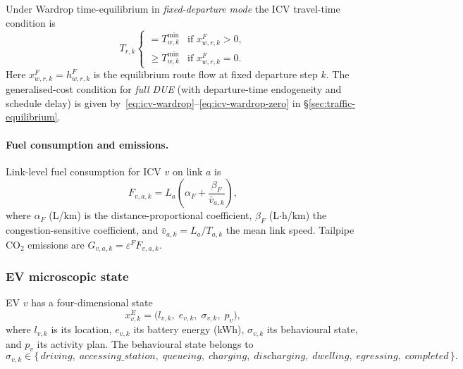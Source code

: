 Under Wardrop time-equilibrium in \emph{fixed-departure mode} the ICV
travel-time condition is
\begin{equation}
  T_{r,k} \begin{cases}
    = T^{\min}_{w,k}   & \text{if } x^F_{w,r,k} > 0, \\
    \ge T^{\min}_{w,k} & \text{if } x^F_{w,r,k} = 0.
  \end{cases}
  \label{eq:icv-wardrop-tt}
\end{equation}
Here $x^F_{w,r,k}=h^F_{w,r,k}$ is the equilibrium route flow at fixed
departure step $k$.  The generalised-cost condition
for \emph{full DUE} (with departure-time endogeneity and schedule delay)
is given by~\eqref{eq:icv-wardrop}--\eqref{eq:icv-wardrop-zero} in
\S\ref{sec:traffic-equilibrium}.

\paragraph{Fuel consumption and emissions.}
Link-level fuel consumption for ICV $v$ on link $a$ is
\begin{equation}
  F_{v,a,k} = L_a \!\left(\alpha_F + \frac{\beta_F}{\bar{v}_{a,k}}\right),
  \label{eq:icv-fuel}
\end{equation}
where $\alpha_F$ (L/km) is the distance-proportional coefficient,
$\beta_F$ (L$\cdot$h/km) the congestion-sensitive coefficient, and
$\bar{v}_{a,k} = L_a / T_{a,k}$ the mean link speed.
Tailpipe CO$_2$ emissions are $G_{v,a,k} = \varepsilon^F F_{v,a,k}$.

\subsubsection{EV microscopic state}

EV $v$ has a four-dimensional state
\begin{equation}
  x^E_{v,k} = \bigl(l_{v,k},\; e_{v,k},\; \sigma_{v,k},\; p_v\bigr),
  \label{eq:ev-state}
\end{equation}
where $l_{v,k}$ is its location, $e_{v,k}$ its battery energy (kWh),
$\sigma_{v,k}$ its behavioural state, and $p_v$ its activity plan.
The behavioural state belongs to
\begin{equation}
  \sigma_{v,k} \in \bigl\{\,
    \textit{driving},\;
    \textit{accessing\_station},\;
    \textit{queueing},\;
    \textit{charging},\;
    \textit{discharging},\;
    \textit{dwelling},\;
    \textit{egressing},\;
    \textit{completed}
  \,\bigr\}.
  \label{eq:ev-states}
\end{equation}

